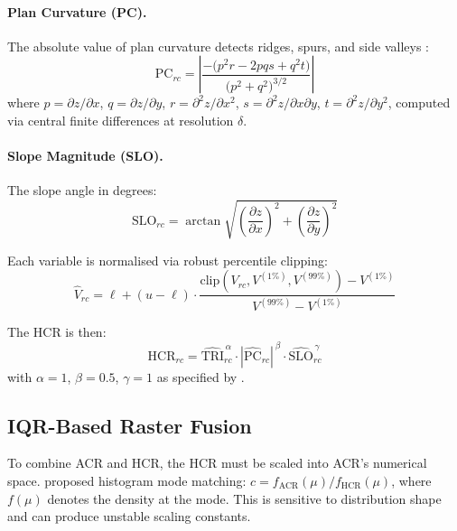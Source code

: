 \documentclass[11pt,a4paper]{article}
\begin{document}
\paragraph{Plan Curvature (PC).}
The absolute value of plan curvature detects ridges, spurs, and side valleys \citep{zevenbergen1987}:
\begin{equation}
  \text{PC}_{rc} = \left| \frac{-\bigl(p^2 r - 2pqs + q^2 t\bigr)}{\bigl(p^2 + q^2\bigr)^{3/2}} \right|
  \label{eq:pc}
\end{equation}
where $p = \partial z / \partial x$, $q = \partial z / \partial y$, $r = \partial^2 z / \partial x^2$, $s = \partial^2 z / \partial x \partial y$, $t = \partial^2 z / \partial y^2$, computed via central finite differences at resolution $\delta$.

\paragraph{Slope Magnitude (SLO).}
The slope angle in degrees:
\begin{equation}
  \text{SLO}_{rc} = \arctan\!\sqrt{\left(\frac{\partial z}{\partial x}\right)^2 + \left(\frac{\partial z}{\partial y}\right)^2}
  \label{eq:slo}
\end{equation}

Each variable is normalised via robust percentile clipping:
\begin{equation}
  \hat{V}_{rc} = \ell + (u - \ell) \cdot \frac{\text{clip}(V_{rc}, V^{(1\%)}, V^{(99\%)}) - V^{(1\%)}}{V^{(99\%)} - V^{(1\%)}}
  \label{eq:norm}
\end{equation}

The HCR is then:
\begin{equation}
  \text{HCR}_{rc} = \widehat{\text{TRI}}_{rc}^{\,\alpha} \cdot |\widehat{\text{PC}}_{rc}|^{\,\beta} \cdot \widehat{\text{SLO}}_{rc}^{\,\gamma}
  \label{eq:hcr}
\end{equation}
with $\alpha = 1$, $\beta = 0.5$, $\gamma = 1$ as specified by \citet{ica2021lcp}.

\subsection{IQR-Based Raster Fusion}
\label{sec:iqr}

To combine ACR and HCR, the HCR must be scaled into ACR's numerical space.
\citet{ica2021lcp} proposed histogram mode matching: $c = f_{\text{ACR}}(\mu) / f_{\text{HCR}}(\mu)$, where $f(\mu)$ denotes the density at the mode.
This is sensitive to distribution shape and can produce unstable scaling constants.
\end{document}
